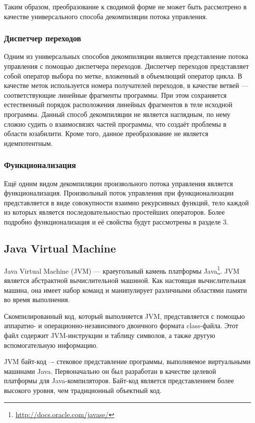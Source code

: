 \documentclass[14pt]{extarticle}
\begin{document}
Таким образом, преобразование к сводимой форме не может быть рассмотрено в качестве универсального способа декомпиляции потока управления.

\pagebreak

\subsubsection*{Диспетчер переходов}
Одним из универсальных способов декомпиляции является представление потока управления с помощью диспетчера переходов\cite{pliss}. Диспетчер переходов представляет собой оператор выбора по метке, вложенный в объемлющий оператор цикла. В качестве меток используется номера получателей переходов, в качестве ветвей --- соответствующие линейные фрагменты программы. При этом сохраняется естественный порядок расположения линейных фрагментов в теле исходной программы. Данный способ декомпиляции не является наглядным, по нему сложно судить о взаимосвязях частей программы, что создаёт проблемы в области юзабилити. Кроме того, данное преобразование не является идемпотентным.

\subsubsection*{Функционализация}
Ещё одним видом декомпиляции произвольного потока управления является функционализация. Произвольный поток управления при функционализации представляется в виде совокупности взаимно рекурсивных функций, тело каждой из которых является последовательностью простейших операторов. Более подробно функционализация и её свойства будут рассмотрены в разделе 3.

\pagebreak
\subsection{Java Virtual Machine}
Java Virtual Machine (JVM) --- краеугольный камень платформы Java\footnote{\url{http://docs.oracle.com/javase/}}. JVM является абстрактной вычислительной машиной. Как настоящая вычислительная машина, она имеет набор команд и манипулирует различными областями памяти во время выполнения. 

Скомпилированный код, который выполняется JVM, представляется с помощью аппаратно- и операционно-независимого двоичного формата class-файла. Этот файл содержит JVM-инструкции и таблицу символов, а также другую вспомогательную информацию.

JVM байт-код –- стековое представление программы, выполняемое виртуальными машинами Java. Первоначально он был разработан в качестве целевой платформы для Java-компиляторов. Байт-код является представлением более высокого уровня, чем традиционный объектный код.
\end{document}
